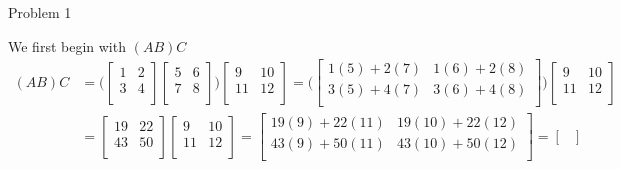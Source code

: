 \begin{problem}{Problem 1}
\begin{Highlight}[Solution]
        We first begin with $(AB)C$
        \begin{align*}
            (AB)C & = 
            \Bigg(
                \begin{bmatrix}
                    1 & 2 \\
                    3 & 4 \\
                \end{bmatrix}
                \begin{bmatrix}
                    5 & 6 \\
                    7 & 8 \\
                \end{bmatrix}
            \Bigg)
            \begin{bmatrix}
                9 & 10 \\
                11 & 12 \\
            \end{bmatrix}
            = 
            \Bigg( 
                \begin{bmatrix}
                    1(5) + 2(7) & 1(6) + 2(8) \\
                    3(5) + 4(7) & 3(6) + 4(8) \\ 
                \end{bmatrix}
            \Bigg)
            \begin{bmatrix}
                9 & 10 \\
                11 & 12 \\
            \end{bmatrix} \\
            & = 
            \begin{bmatrix}
                19 & 22 \\
                43 & 50 \\
            \end{bmatrix}
            \begin{bmatrix}
                9 & 10 \\
                11 & 12 \\
            \end{bmatrix}
            = 
            \begin{bmatrix}
                19(9) + 22(11) & 19(10) + 22(12) \\
                43(9) + 50(11) & 43(10) + 50(12) \\
            \end{bmatrix}
            =
            \begin{bmatrix}

\end{bmatrix}
\end{align*}
\end{Highlight}
\end{problem}
